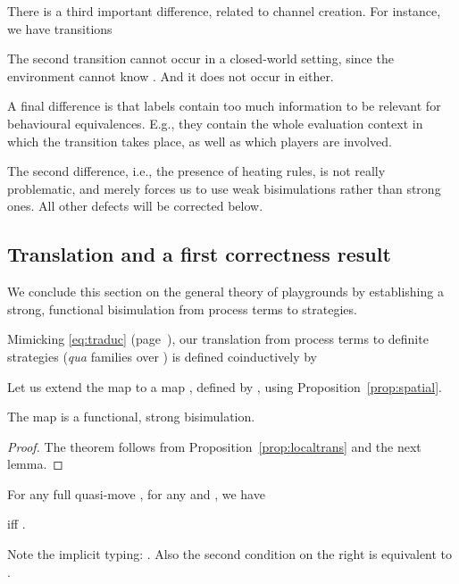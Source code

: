 \documentclass{LMCS}
\theoremstyle{plain}\newtheorem{satz}[thm]{Satz}
\begin{document}
\begin{exa}
  There is a third important difference, related to channel
  creation. For instance, we have transitions
  
  The second transition cannot occur in a closed-world setting, since
  the environment cannot know .  And it does not occur in 
  either.

  A final difference is that labels contain too much information to be
  relevant for behavioural equivalences. E.g., they contain the whole
  evaluation context in which the transition takes place, as well as
  which players are involved.

  The second difference, i.e., the presence of heating rules, is not
  really problematic, and merely forces us to use weak bisimulations
  rather than strong ones.  All other defects will be corrected below.
\end{exa}

\subsection{Translation and a first correctness result}
We conclude this section on the general theory of playgrounds by
establishing a strong, functional bisimulation from process terms to
strategies.

Mimicking \eqref{eq:traduc} (page~\pageref{eq:traduc}), our
translation from process terms to definite strategies (\emph{qua}
families over ) is defined coinductively by


Let us extend the map  to a map
, defined by
, using
Proposition~\ref{prop:spatial}.


\begin{thm}\label{thm:bisim}
  The map  is a
  functional, strong bisimulation.
\end{thm}
\begin{proof}
  The theorem follows from Proposition~\ref{prop:localtrans} and the next lemma.
\end{proof}

\begin{lem}
  For any full quasi-move , for any  and , we have
  \begin{center}
     \hfil iff \hfil
    .
  \end{center}
\end{lem}
Note the implicit typing: . Also
the second condition on the right is equivalent to .
\end{document}
